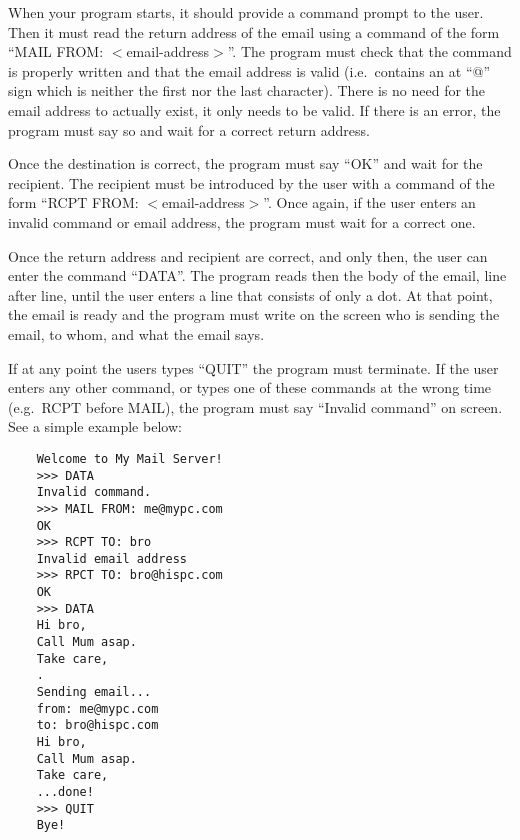\documentclass{article}
\begin{document}
When your program starts, it should provide a command prompt to the
user. Then it must read the return address of the email using a
command of the form ``MAIL FROM: $<$email-address$>$''. The program
must check that the command is properly written and that the email
address is valid (i.e.~contains an at ``@'' sign which is neither the
first nor the last character). There is no need for the email address
to actually exist, it only needs to be valid. If there is an error,
the program must 
say so and wait for a correct return address.

Once the destination is correct, the program must say ``OK'' and wait
for the recipient. The recipient must be introduced by the user with a
command of the form ``RCPT FROM: $<$email-address$>$''. Once again, if
the user enters an invalid command or email address, the program must
wait for a correct one. 

Once the return address and recipient are correct, and only then, the
user can enter the command ``DATA''. The program reads then the body
of the email, line after line, until the user enters a line that
consists of only a dot. At that point, the email is ready and the
program must write on the screen who is sending the email, to whom,
and what the email says. 

If at any point the users types ``QUIT'' the program must
terminate. If the user enters any other command, or types one of these
commands at the wrong time (e.g.~RCPT before MAIL), the program must
say ``Invalid command'' on screen. See a simple example below: 

\begin{verbatim}
    Welcome to My Mail Server!
    >>> DATA
    Invalid command. 
    >>> MAIL FROM: me@mypc.com
    OK
    >>> RCPT TO: bro
    Invalid email address
    >>> RPCT TO: bro@hispc.com
    OK
    >>> DATA
    Hi bro, 
    Call Mum asap.
    Take care,
    .
    Sending email...
    from: me@mypc.com
    to: bro@hispc.com
    Hi bro, 
    Call Mum asap.
    Take care,
    ...done!
    >>> QUIT
    Bye!    
\end{verbatim}
\end{document}
